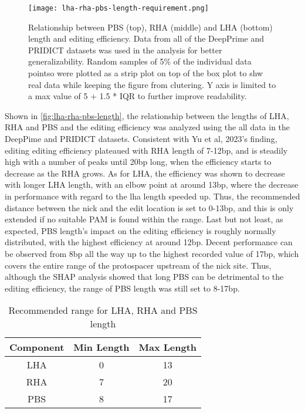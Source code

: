 \begin{figure}
    \texttt{[image: lha-rha-pbs-length-requirement.png]}
    \caption[Relationship between LHA, RHA and PBS length and editing efficiency]{Relationship between PBS (top), RHA (middle) and LHA (bottom) length and editing efficiency. Data from all of the DeepPrime and PRIDICT datasets was used in the analysis for better generalizability. Random samples of 5\% of the individual data pointso were plotted as a strip plot on top of the box plot to shw real data while keeping the figure from clutering. Y axis is limited to a max value of 5 + 1.5 * IQR to further improve readability. }
    \label{fig:lha-rha-pbs-length}
\end{figure}


Shown in \autoref{fig:lha-rha-pbs-length}, the relationship between the lengths of LHA, RHA and PBS and the editing efficiency was analyzed using the all data in the DeepPime and PRIDICT datasets. Consistent with Yu et al, 2023's finding, editing editing efficiency plateaued with RHA length of 7-12bp, and is steadily high with a number of peaks until 20bp long, when the efficiency starts to decrease as the RHA grows.  As for LHA, the efficiency was shown to decrease with longer LHA length, with an elbow point at around 13bp, where the decrease in performance with regard to the lha length speeded up. Thus, the recommended distance between the nick and the edit location is set to 0-13bp, and this is only extended if no suitable PAM is found within the range. Last but not least, as expected, PBS length's impact on the editing efficiency is roughly normally distributed, with the highest efficiency at around 12bp. Decent performance can be observed from 8bp all the way up to the highest recorded value of 17bp, which covers the entire range of the protospacer upstream of the nick site. Thus, although the SHAP analysis showed that long PBS can be detrimental to the editing efficiency, the range of PBS length was still set to 8-17bp.

\begin{table}[ht]
    \centering
    \begin{tabular}{c|c|c}
        \textbf{Component} & \textbf{Min Length} & \textbf{Max Length} \\
        \hline
        LHA & 0 & 13 \\
        RHA & 7 & 20 \\
        PBS & 8 & 17 \\
    \end{tabular}
    \caption{Recommended range for LHA, RHA and PBS length}
    \label{tab:recommended-range}
\end{table}

